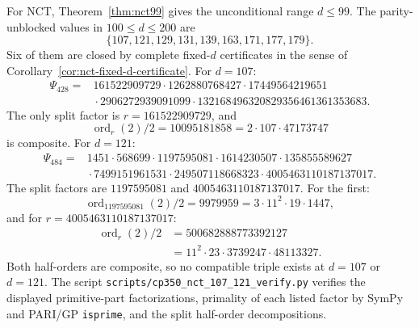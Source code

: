 \documentclass[11pt]{amsart}
\theoremstyle{plain}
\theoremstyle{definition}
\theoremstyle{remark}
\numberwithin{equation}{section}
\newcommand{\ord}{\operatorname{ord}}
\begin{document}
For NCT, Theorem~\ref{thm:nct99} gives the unconditional range $d\leq99$. The parity-unblocked values in $100\leq d\leq200$ are
\[
  \{107,121,129,131,139,163,171,177,179\}.
\]
Six of them are closed by complete fixed-$d$ certificates in the sense of Corollary~\ref{cor:nct-fixed-d-certificate}. For $d=107$:
\[
\begin{aligned}
  \Psi_{428}={}&
  161522909729\cdot1262880768427\cdot17449564219651\\
  &{}\cdot2906272939091099\cdot132168496320829356461361353683.
\end{aligned}
\]
The only split factor is $r=161522909729$, and
\[
  \ord_r(2)/2=10095181858
  =2\cdot107\cdot47173747
\]
is composite. For $d=121$:
\[
\begin{aligned}
  \Psi_{484}={}&
  1451\cdot568699\cdot1197595081\cdot1614230507
  \cdot135855589627\\
  &{}\cdot7499151961531\cdot249507118668323
  \cdot4005463110187137017.
\end{aligned}
\]
The split factors are $1197595081$ and $4005463110187137017$. For the first:
\[
  \ord_{1197595081}(2)/2
  =9979959=3\cdot11^2\cdot19\cdot1447,
\]
and for $r=4005463110187137017$:
\[
\begin{aligned}
  \ord_r(2)/2
  &=500682888773392127\\
  &=11^2\cdot23\cdot3739247\cdot48113327.
\end{aligned}
\]
Both half-orders are composite, so no compatible triple exists at $d=107$ or $d=121$. The script \texttt{scripts/cp350\_nct\_107\_121\_verify.py} verifies the displayed primitive-part factorizations, primality of each listed factor by SymPy and PARI/GP \texttt{isprime}, and the split half-order decompositions.
\end{document}
